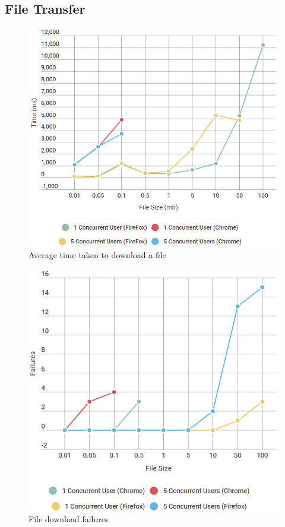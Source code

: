 \documentclass[]{report}
\begin{document}
		\subsection{File Transfer}
		\begin{figure}[H]
			\caption{Average time taken to download a file}
			\centering
			\includegraphics[scale=0.5]{download-chart.png}
		\end{figure}
		\begin{figure}[H]
			\caption{File download failures}
			\centering
			\includegraphics[scale=0.5]{download-failures-chart.png}
		\end{figure}
		
\end{document}
